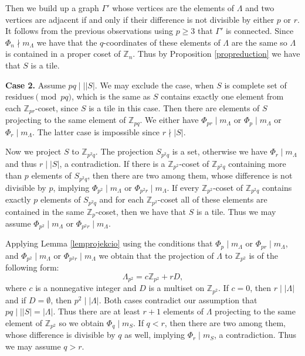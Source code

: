 \documentclass[10pt]{article}
\newcommand{\Z}{\mathbb{Z}}
\newcommand{\La}{\Lambda}
\begin{document}
        Then we build up a graph $\Gamma'$ whose vertices are the elements of $\La$ and two vertices are adjacent if and only if their difference is not divisible by either $p$ or $r$. It follows from the previous observations using $p \ge 3$ that $\Gamma'$ is connected. 
        Since $\Phi_n \nmid m_\La$ we have that the $q$-coordinates of these elements of $\La$ are the same so $\La$ is contained in a proper coset of $\Z_n$. Thus by Proposition \ref{propreduction} we have that $S$ is a tile. 
        
        {\bf Case 2.} Assume $pq \mid\mid |S|$.
        We  may exclude the case, when  $S$ is complete set of residues$\pmod{pq}$, which is the same as $S$ contains exactly one element from each $\Z_{pr}$-coset, since $S$ is a tile in this case. Then there are elements of $S$ projecting to the same element of $\Z_{pq}$. We either have $\Phi_{pr} \mid m_{\La}$ or $\Phi_p \mid m_{\La}$ or $\Phi_{r} \mid m_{\La}$.  The latter case is impossible since $r \nmid |S|$.
        
        Now we project $S$ to $\Z_{p^2q}$. The projection $S_{p^2q}$ is a set, otherwise we have $\Phi_r  \mid m_{\La}$ and thus $r \mid |S|$, a contradiction. If there is a $\Z_{p^2}$-coset of $\Z_{p^2q}$ containing more than $p$ elements of $S_{p^2q}$, then there are two among them, whose difference is not divisible by $p$, implying $\Phi_{p^2} \mid m_{\La}$ or $\Phi_{p^2r} \mid m_{\La}$.
        If every $\Z_{p^2}$-coset of $\Z_{p^2q}$ contains exactly $p$ elements of $S_{p^2q}$ and for each $\Z_{p^2}$-coset all of these elements are contained in the same $\Z_p$-coset, then we have that $S$ is a tile. Thus we may assume $\Phi_{p^2} \mid m_{\La}$ or $\Phi_{p^2r} \mid m_{\La}$.
        
        Applying Lemma \ref{lemprojekcio} using the conditions that $\Phi_p \mid m_{\La}$ or $\Phi_{pr} \mid m_{\La}$,   and $\Phi_{p^2} \mid m_{\La}$ or $\Phi_{p^2r} \mid m_{\La}$
        we obtain that the projection of $\La$ to $\Z_{p^2}$ is of the following form: 
        \begin{equation}\label{eqp2}
             \La_{p^2}=c \Z_{p^2}+rD, 
             \end{equation}
        where $c$ is a nonnegative integer and $D$ is a multiset on $\Z_{p^2}$. 
        If $c = 0$, then $r \mid |\La|$ and if $D=\emptyset$, then $p^2 \mid |\La|$. 
        Both cases contradict our assumption that $pq \mid \mid |S|=|\La|$. 
        Thus there are at least $r+1$ elements of $\La$ projecting to the same element of $\Z_{p^2}$ so we obtain $\Phi_q \mid m_S$. If $q <r$, then there are two among them, whose difference is divisible by $q$ as well, implying $\Phi_r \mid m_S$, a contradiction. Thus we may assume $q>r$.  
        
\end{document}

